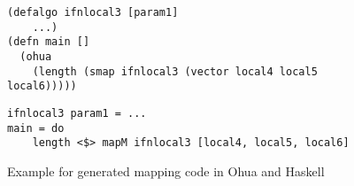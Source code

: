 \begin{figure}
\begin{verbatim}
(defalgo ifnlocal3 [param1]
    ...)
(defn main []
  (ohua
    (length (smap ifnlocal3 (vector local4 local5 local6)))))
\end{verbatim}
\begin{verbatim}
ifnlocal3 param1 = ...
main = do
    length <$> mapM ifnlocal3 [local4, local5, local6]
\end{verbatim}
\caption{Example for generated mapping code in Ohua and Haskell}
\label{fig:generated-map-code}
\end{figure}
